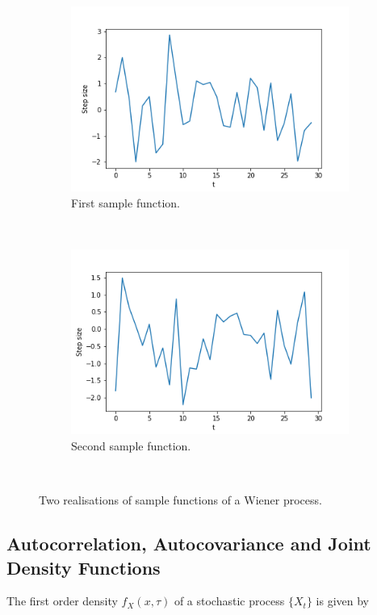 \documentclass[]{article}
\begin{document}
\begin{figure}[h!]
	\centering
	\begin{subfigure}[b]{0.4\textwidth}
		\includegraphics[width=\textwidth]{figs/random_processes/wiener_process_1.png}
		\caption{First sample function.}
		\label{fig:wiener_process_1}
	\end{subfigure}
	~
	\begin{subfigure}[b]{0.4\textwidth}
		\includegraphics[width=\textwidth]{figs/random_processes/wiener_process_2.png}
		\caption{Second sample function.}
		\label{fig:wiener_process_2}
	\end{subfigure}
	~
	\caption{Two realisations of sample functions of a Wiener process.}\label{fig:wiener_process}
\end{figure}

\subsection{Autocorrelation, Autocovariance and Joint Density Functions}
The first order density $f_{X}(x, \tau)$ of a stochastic process $\{ X_{t} \}$ is given by
\end{document}
